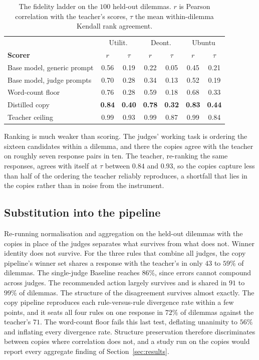 \documentclass[10pt,twocolumn,a4paper]{article}
\begin{document}
\begin{table}[H]
\centering
\small
\caption{The fidelity ladder on the $100$ held-out dilemmas. $r$ is
Pearson correlation with the teacher's scores, $\tau$ the mean
within-dilemma Kendall rank agreement.}
\label{tab:distil}
\vspace{4pt}
\begin{tabular}{@{}lcccccc@{}}
\toprule
& \multicolumn{2}{c}{Utilit.} & \multicolumn{2}{c}{Deont.} & \multicolumn{2}{c}{Ubuntu} \\
\textbf{Scorer} & $r$ & $\tau$ & $r$ & $\tau$ & $r$ & $\tau$ \\
\midrule
Base model, generic prompt & 0.56 & 0.19 & 0.22 & 0.05 & 0.45 & 0.21 \\
Base model, judge prompts  & 0.70 & 0.28 & 0.34 & 0.13 & 0.52 & 0.19 \\
Word-count floor           & 0.76 & 0.28 & 0.59 & 0.18 & 0.68 & 0.33 \\
Distilled copy             & \textbf{0.84} & \textbf{0.40} & \textbf{0.78} & \textbf{0.32} & \textbf{0.83} & \textbf{0.44} \\
Teacher ceiling            & 0.99 & 0.93 & 0.99 & 0.87 & 0.99 & 0.84 \\
\bottomrule
\end{tabular}
\end{table}

Ranking is much weaker than scoring. The judges' working task is
ordering the sixteen candidates within a dilemma, and there the copies
agree with the teacher on roughly seven response pairs in ten. The
teacher, re-ranking the same responses, agrees with itself at $\tau$
between $0.84$ and $0.93$, so the copies capture less than half of the
ordering the teacher reliably reproduces, a shortfall that lies in the
copies rather than in noise from the instrument.

\subsection{Substitution into the pipeline}

Re-running normalisation and aggregation on the held-out dilemmas with
the copies in place of the judges separates what survives from what
does not. Winner identity does not survive. For the three rules that
combine all judges, the copy pipeline's winner set shares a response
with the teacher's in only $43$ to $59\%$ of dilemmas. The single-judge
Baseline reaches $86\%$, since errors cannot compound across judges.
The recommended action largely survives and is shared in $91$ to $99\%$
of dilemmas. The structure of the disagreement survives almost exactly.
The copy pipeline reproduces each rule-versus-rule divergence rate
within a few points, and it seats all four rules on one response in
$72\%$ of dilemmas against the teacher's $71$. The word-count floor
fails this last test, deflating unanimity to $56\%$ and inflating every
divergence rate. Structure preservation therefore discriminates between
copies where correlation does not, and a study run on the copies would
report every aggregate finding of Section~\ref{sec:results}.
\end{document}

